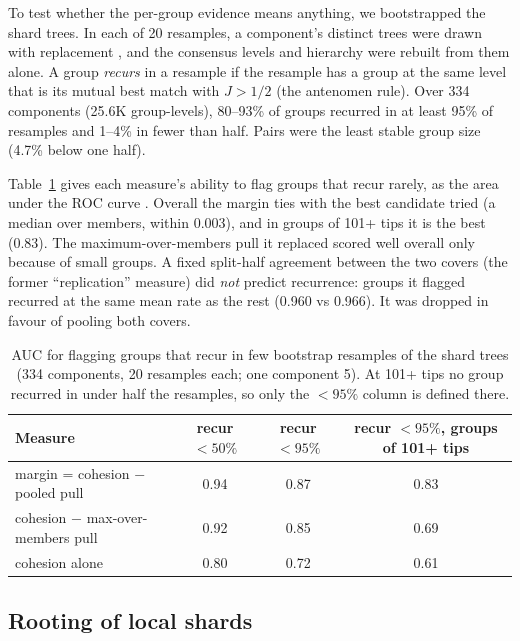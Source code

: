 \documentclass[11pt,a4paper]{article}
\begin{document}
To test whether the per-group evidence means anything, we bootstrapped the shard trees. In each of
20 resamples, a component's distinct trees were drawn with replacement \citep{efron1979bootstrap},
and the consensus levels and hierarchy were rebuilt from them alone. A group \emph{recurs} in a
resample if the resample has a group at the same level that is its mutual best match with
$J > 1/2$ (the antenomen rule). Over 334 components (25.6K group-levels), 80--93\% of groups
recurred in at least 95\% of resamples and 1--4\% in fewer than half. Pairs were the least stable
group size (4.7\% below one half).

Table~\ref{tab:auc} gives each measure's ability to flag groups that recur rarely, as the area
under the ROC curve \citep{hanley1982auc}. Overall the margin ties with the best
candidate tried (a median over members, within 0.003), and in groups of 101+ tips it is the best
(0.83). The maximum-over-members pull it replaced scored well overall only because of small groups.
A fixed split-half agreement between the two covers (the former ``replication'' measure) did
\emph{not} predict recurrence: groups it flagged recurred at the same mean rate as the rest (0.960
vs 0.966). It was dropped in favour of pooling both covers.

\begin{table}[t]
\centering\small
\caption{AUC for flagging groups that recur in few bootstrap resamples of the shard trees
(334 components, 20 resamples each; one component 5). At 101+ tips no group recurred in under half
the resamples, so only the $<95\%$ column is defined there.}
\label{tab:auc}
\begin{tabular}{@{}lccc@{}}
\toprule
Measure & recur $<50\%$ & recur $<95\%$ & recur $<95\%$, groups of 101+ tips \\
\midrule
margin = cohesion $-$ pooled pull & 0.94 & 0.87 & 0.83 \\
cohesion $-$ max-over-members pull & 0.92 & 0.85 & 0.69 \\
cohesion alone & 0.80 & 0.72 & 0.61 \\
\bottomrule
\end{tabular}
\end{table}

\subsection{Rooting of local shards}\label{sec:res-rooting}
\end{document}
